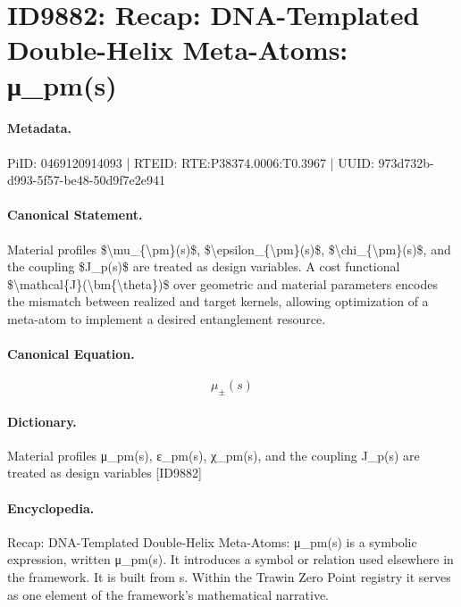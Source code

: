 \section*{ID9882: Recap: DNA-Templated Double-Helix Meta-Atoms: μ\_pm(s)}
\paragraph{Metadata.}
PiID: 0469120914093 | RTEID: RTE:P38374.0006:T0.3967 | UUID: 973d732b-d993-5f57-be48-50d9f7e2e941

\paragraph{Canonical Statement.}
Material profiles \$\textbackslash{}mu\_\{\textbackslash{}pm\}(s)\$, \$\textbackslash{}epsilon\_\{\textbackslash{}pm\}(s)\$, \$\textbackslash{}chi\_\{\textbackslash{}pm\}(s)\$, and the coupling \$J\_p(s)\$ are treated as design variables. A cost functional \$\textbackslash{}mathcal\{J\}(\textbackslash{}bm\{\textbackslash{}theta\})\$ over geometric and material parameters encodes the mismatch between realized and target kernels, allowing optimization of a meta-atom to implement a desired entanglement resource.

\paragraph{Canonical Equation.}
\[
\mu_{\pm}(s)
\]

\paragraph{Dictionary.}
Material profiles μ\_pm(s), ε\_pm(s), χ\_pm(s), and the coupling J\_p(s) are treated as design variables [ID9882]

\paragraph{Encyclopedia.}
Recap: DNA-Templated Double-Helix Meta-Atoms: μ\_pm(s) is a symbolic expression, written μ\_pm(s). It introduces a symbol or relation used elsewhere in the framework. It is built from s. Within the Trawin Zero Point registry it serves as one element of the framework's mathematical narrative.
